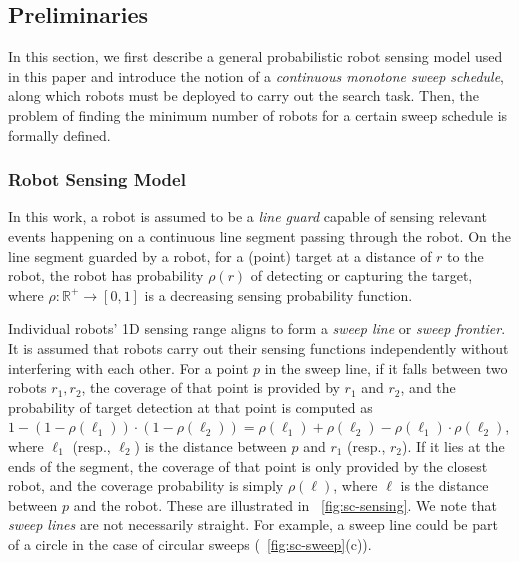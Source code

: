 
\subsection{Preliminaries}

In this section, we first describe a general probabilistic robot sensing model 
used in this paper and introduce the notion of a \emph{continuous monotone 
sweep schedule}, along which robots must be deployed to carry out the 
search task. 
%
Then, the problem of finding the minimum number of robots for a certain 
sweep schedule is formally defined.

\subsubsection{Robot Sensing Model}
\label{sec:sc-sensing}

In this work, a robot is assumed to be a \emph{line guard} capable of sensing 
relevant events happening on a continuous line segment passing through the
robot. 
%
On the line segment guarded by a robot, for a (point) target at a distance 
of $r$ to the robot, the robot has probability $\rho(r)$ of 
detecting or capturing the target, where $\rho: \mathbb{R}^+\rightarrow[0,1]$ 
is a decreasing sensing probability function. 
%

Individual robots' 1D sensing range aligns to form a \emph{sweep line} or \emph{sweep frontier}.
%
It is assumed that robots carry out their sensing functions independently 
without interfering with each other.
%
For a point $p$ in the sweep line, if it falls between two robots $r_1, r_2$, 
the coverage of that point is provided by $r_1$ and $r_2$, and the 
probability of target detection at that point is computed as $1-(1-\rho(\ell_1))\cdot(1-\rho(\ell_2))=\rho(\ell_1) + \rho(\ell_2) - \rho(\ell_1) \cdot \rho(\ell_2)$, 
where $\ell_1$ (resp., $\ell_2$) is the distance between $p$ and $r_1$ (resp., $r_2$).
%
If it lies at the ends of the segment, the coverage of that point is only provided by the closest robot, 
and the coverage probability is simply $\rho(\ell)$, where $\ell$ is the distance between $p$ and the robot. 
These are illustrated in ~\ref{fig:sc-sensing}.
%
We note that \emph{sweep lines} are not necessarily straight. 
For example, a sweep line could be part of a circle in the case of circular sweeps (~\ref{fig:sc-sweep}(c)).

